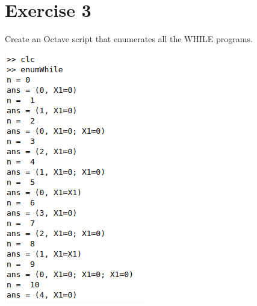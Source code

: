 \documentclass[11pt]{article}
\begin{document}
\section{Exercise 3}
Create an Octave script that enumerates all the WHILE programs.

\includegraphics[scale=0.5]{enumWhile.png}
\end{document}
